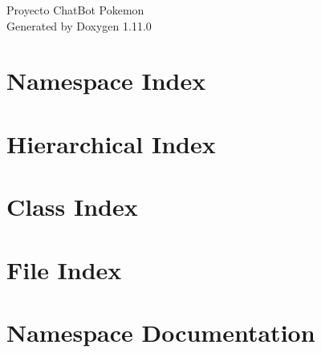 \documentclass[twoside]{book}
\newcommand{\+}{\discretionary{\mbox{\scriptsize$\hookleftarrow$}}{}{}}
\newcommand{\clearemptydoublepage}{%
    \newpage{\pagestyle{empty}\cleardoublepage}%
  }
\begin{document}
  \raggedbottom
    \hypersetup{pageanchor=false,
                bookmarksnumbered=true,
                pdfencoding=unicode
               }
  \begin{titlepage}
  \vspace*{7cm}
  \begin{center}%
  {\Large Proyecto Chat\+Bot Pokemon}\\
  \vspace*{1cm}
  {\large Generated by Doxygen 1.11.0}\\
  \end{center}
  \end{titlepage}
  \clearemptydoublepage
  \tableofcontents
  \clearemptydoublepage
  \hypersetup{pageanchor=true}
\chapter{Namespace Index}

\chapter{Hierarchical Index}

\chapter{Class Index}

\chapter{File Index}

\chapter{Namespace Documentation}













\end{document}
